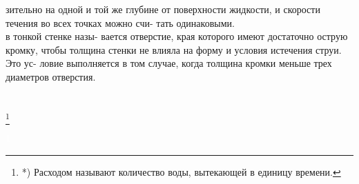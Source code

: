 \begin{minipage}[t]{0.44\textwidth}
        зительно на одной и той же глубине\linebreak
        от поверхности жидкости, и скорости\linebreak
        течения во всех точках можно счи-\linebreak
        тать одинаковыми.\\
        \null{} в тонкой стенке назы-\linebreak
        вается отверстие, края которого имеют\linebreak
        достаточно острую кромку, чтобы\linebreak
        толщина стенки не влияла на форму\linebreak
        и условия истечения струи. Это ус-\linebreak
        ловие выполняется в том случае,\linebreak
        когда толщина кромки меньше трех\linebreak
        диаметров отверстия.
        \\
        \\
        \\
        \footnote[0]{*) Расходом называют количество воды,\linebreak
        вытекающей в единицу времени.}%
\end{minipage}
\begin{minipage}[t]{0.02\textwidth} %
\center
\textcolor{white}{\hbox{1}} 
\end{minipage}
